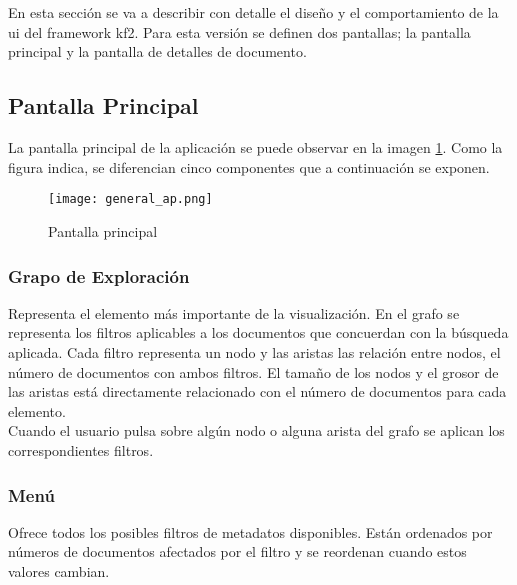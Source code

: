 \section{}
\begin{comment}
En esta sección se detallarán las interfaces entre el sistema y el usuario, incluyendo un prototipo de alta fidelidad con el diseño de la IU. Se definirá el comportamiento de las diferentes pantallas, indicando qué ocurre en los distintos componentes visuales de la interfaz cuando aparecen y qué acciones se disparan cuando el usuario trabaja con ellas.
\end{comment}
En esta sección se va a describir con detalle el diseño y el comportamiento de la \gls{ui} del \gls{framework} \gls{kf2}. Para esta versión se definen dos pantallas; la pantalla principal y la pantalla de detalles de documento.


\subsection{Pantalla Principal}
La pantalla principal de la aplicación se puede observar en la imagen \ref{image:uiprincipal}. Como la figura indica, se diferencian cinco componentes que a continuación se exponen.

\begin{figure}[h!]
  \centering
  	\texttt{[image: general\_ap.png]}
  \caption{Pantalla principal}
  \label{image:uiprincipal}
\end{figure}

\subsubsection{Grapo de Exploración}
Representa el elemento más importante de la visualización. En el grafo se representa los filtros aplicables a los documentos que concuerdan con la búsqueda aplicada. Cada filtro representa un nodo y las aristas las relación entre nodos, el número de documentos con ambos filtros. El tamaño de los nodos y el grosor de las aristas está directamente relacionado con el número de documentos para cada elemento.\\

Cuando el usuario pulsa sobre algún nodo o alguna arista del grafo se aplican los correspondientes filtros.

\subsubsection{Menú}
Ofrece todos los posibles filtros de \glspl{metadato} disponibles. Están ordenados por números de documentos afectados por el filtro y se reordenan cuando estos valores cambian.\\


